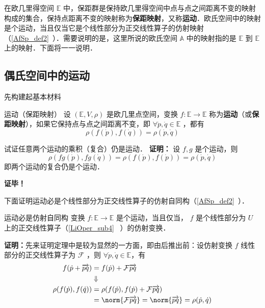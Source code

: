 
\begin{issues}
\end{issues}

在欧几里得空间 $\mathbb E$ 中，保距群是保持欧几里得空间中点与点之间距离不变的映射构成的集合，保持点距离不变的映射称为\textbf{保距映射}，又称\textbf{运动}．欧氏空间中的映射是个运动，当且仅当它是个线性部分为正交线性算子的仿射映射（\autoref{AfSp_def2}~）．需要说明的是，这里所说的欧氏空间 $\mathbb A$ 中的映射指的是 $\mathbb E$ 到 $\mathbb E$ 上的映射．下面将一一说明．
\subsection{偶氏空间中的运动}
先构建起基本材料
\begin{definition}{运动（保距映射）}
设 $(\mathbb E,V,\rho)$ 是欧几里点空间，变换 $f:\mathbb E\rightarrow\mathbb E$ 称为\textbf{运动}（或\textbf{保距映射}），如果它保持点与点之间距离不变，即 $\forall \dot p,\dot q\in\mathbb E$ ，都有
\begin{equation}
\rho(f(\dot p),f(\dot q))=\rho(\dot p,\dot q)
\end{equation}
\end{definition}
\begin{example}{}\label{CDQ2Ec_ex1}
试证任意两个运动的乘积（复合）仍是运动．
\textbf{证明：}
设 $f,g$ 是个运动，则
\begin{equation}
\rho(fg(\dot p),fg(\dot q))=\rho(f(\dot p),f(\dot p))=\rho(\dot p,\dot q)
\end{equation}
即两个运动的复合仍是个运动．

\textbf{证毕！}
\end{example}
下面证明运动必是个线性部分为正交线性算子的仿射自同构（\autoref{AfSp_def2}~）．


\begin{theorem}{运动必是仿射自同构}
变换 $f:\mathbb E\rightarrow\mathbb E$ 是个运动，当且仅当， $f$ 是个线性部分为 $U$ 上的正交线性算子（\autoref{LiOper_sub4}~ ）的仿射变换．
\end{theorem}
\textbf{证明：}先来证明定理中是较为显然的一方面，即由后推出前：设仿射变换 $f$ 线性部分的正交线性算子为 $\mathcal F$ ，则 $\forall \dot p,\dot q\in\mathbb E$，有
\begin{equation}
\begin{aligned}
f(\dot p+\overrightarrow{pq})&=f(\dot p)+\mathcal F\overrightarrow{pq}\\
&\Downarrow\\
\rho(f(\dot p),f(\dot q))&=\rho(f(\dot p),f(\dot p)+\mathcal F\overrightarrow{pq})\\
&=\norm{\mathcal F\overrightarrow{pq}}=\norm{\overrightarrow{pq}}=\rho(\dot p,\dot q)
\end{aligned}
\end{equation}

